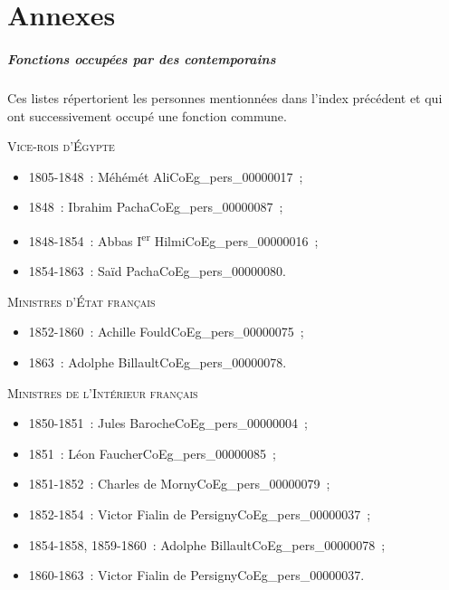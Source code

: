 \documentclass{book}
\begin{document}
\cleardoublepage
\part*{Annexes}
{}

\cleardoublepage
{}
{}

\cleardoublepage
{}
{}
\printnoidxglossary[type={contemp}]

\cleardoublepage
\subsubsection*{Fonctions occupées par des contemporains}
{}
Ces listes répertorient les personnes mentionnées dans l’index précédent et qui ont successivement occupé une fonction commune.\\
\begin{center} \textsc{Vice-rois d’Égypte} \end{center} \begin{itemize}
\item 1805-1848~: Méhémét Ali\gls{CoEg_pers_00000017}~;
\item 1848~: Ibrahim Pacha\gls{CoEg_pers_00000087}~;
\item 1848-1854~: Abbas I\textsuperscript{er} Hilmi\gls{CoEg_pers_00000016}~;
\item 1854-1863~: Saïd Pacha\gls{CoEg_pers_00000080}.\end{itemize}

\begin{center} \textsc{Ministres d’État français}\end{center} \begin{itemize}
\item 1852-1860~: Achille Fould\gls{CoEg_pers_00000075}~;
\item 1863~: Adolphe Billault\gls{CoEg_pers_00000078}. \end{itemize}

\begin{center} \textsc{Ministres de l’Intérieur français}\end{center} \begin{itemize}
\item 1850-1851~: Jules Baroche\gls{CoEg_pers_00000004}~;
\item 1851~: Léon Faucher\gls{CoEg_pers_00000085}~;
\item 1851-1852~: Charles de Morny\gls{CoEg_pers_00000079}~;
\item 1852-1854~: Victor Fialin de Persigny\gls{CoEg_pers_00000037}~;
\item 1854-1858, 1859-1860~: Adolphe Billault\gls{CoEg_pers_00000078}~;
\item 1860-1863~: Victor Fialin de Persigny\gls{CoEg_pers_00000037}. \end{itemize}
\end{document}
